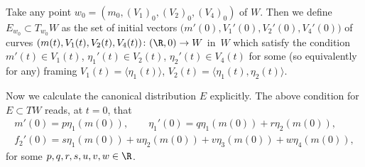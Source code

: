 Take any point $w_0 = (m_0, (V_1)_0, (V_2)_0, (V_4)_0)$ of $W$. Then
we define $E_{w_0} \subset T_{w_0}W$ as the set of initial vectors
$
\bigl(m'(0), V_1'(0), V_2'(0), V_4'(0)\bigr)
$
of curves $(m(t), V_1(t), V_2(t), V_4(t)) \colon (\R, 0) \to W$ in~$W$ which satisfy the condition
$m'(t) \in V_1(t)$, $\eta_1'(t) \in V_2(t)$, $\eta_2'(t) \in V_4(t)$ for some (so equivalently for any) framing
$V_1(t) = \langle \eta_1(t)\rangle$, $V_2(t) = \langle \eta_1(t), \eta_2(t)\rangle$.

Now we calculate the canonical distribution $E$ explicitly.
The above condition for $E \subset TW$ reads, at $t = 0$, that
\begin{gather*}
m'(0) = p \eta_1(m(0)), \qquad \eta_1'(0) = q \eta_1(m(0)) + r \eta_2(m(0)),
\\
f_2'(0) = s \eta_1(m(0)) + u \eta_2(m(0)) + v \eta_3(m(0)) + w \eta_4(m(0)),
\end{gather*}
for some $p, q, r, s, u, v, w \in \R$.

